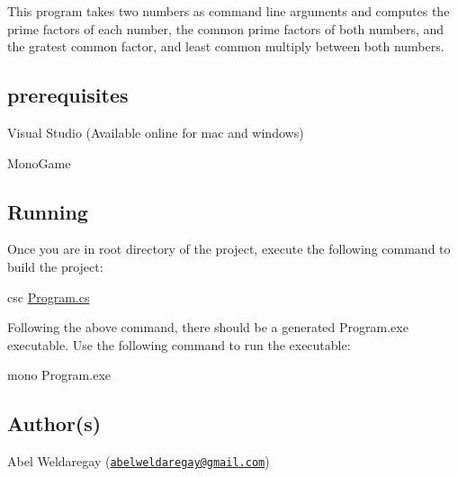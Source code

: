 This program takes two numbers as command line arguments and computes the prime factors of each number, the common prime factors of both numbers, and the gratest common factor, and least common multiply between both numbers.

\subsection*{prerequisites}


\begin{DoxyItemize}
\item Visual Studio (Available online for mac and windows)
\item Mono\-Game
\end{DoxyItemize}

\subsection*{Running}

Once you are in root directory of the project, execute the following command to build the project\-:\par
 {\ttfamily csc \hyperlink{_program_8cs}{Program.\-cs}}\par
 Following the above command, there should be a generated Program.\-exe executable. Use the following command to run the executable\-:\par
 {\ttfamily mono Program.\-exe} \subsection*{Author(s)}


\begin{DoxyItemize}
\item Abel Weldaregay (\href{mailto:abelweldaregay@gmail.com}{\tt abelweldaregay@gmail.\-com}) 
\end{DoxyItemize}